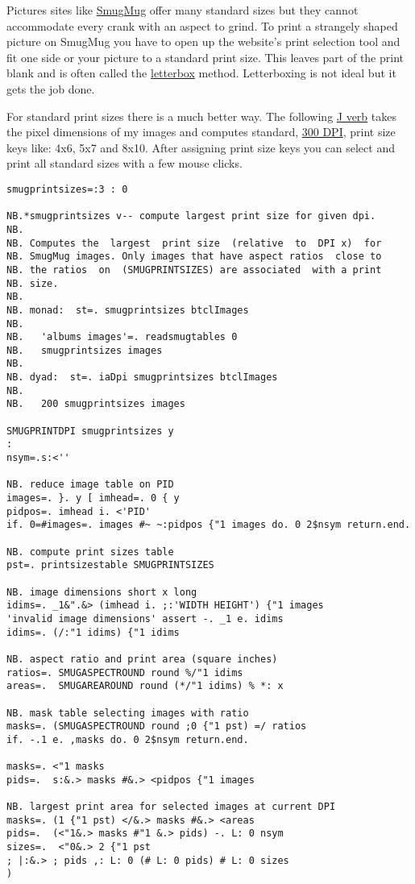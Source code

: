 Pictures sites like \href{http://www.smugmug.com/}{SmugMug} offer many
standard sizes but they cannot accommodate every crank with an aspect to
grind. To print a strangely shaped picture on SmugMug you have to open
up the website's print selection tool and fit one side or your picture
to a standard print size. This leaves part of the print blank and is
often called the
\href{http://en.wikipedia.org/wiki/Letterbox}{letterbox} method.
Letterboxing is not ideal but it gets the job done.

For standard print sizes there is a much better way. The following
\href{http://www.jsoftware.com/}{J verb} takes the pixel dimensions of
my images and computes standard,
\href{http://www.rideau-info.com/photos/mythdpi.html}{300 DPI}, print
size keys like: 4x6, 5x7 and 8x10. After assigning print size keys you
can select and print all standard sizes with a few mouse clicks.

\begin{tcolorbox}[breakable, size=fbox, boxrule=1pt, pad at break*=1mm,colback=cellbackground, colframe=cellborder]
\begin{lstlisting}[language=jdoc, frame=single,framerule=0pt,label=lst:scr442X0]
smugprintsizes=:3 : 0

NB.*smugprintsizes v-- compute largest print size for given dpi.
NB.
NB. Computes the  largest  print size  (relative  to  DPI x)  for
NB. SmugMug images. Only images that have aspect ratios  close to
NB. the ratios  on  (SMUGPRINTSIZES) are associated  with a print
NB. size.
NB.
NB. monad:  st=. smugprintsizes btclImages
NB.
NB.   'albums images'=. readsmugtables 0
NB.   smugprintsizes images
NB.
NB. dyad:  st=. iaDpi smugprintsizes btclImages
NB.
NB.   200 smugprintsizes images

SMUGPRINTDPI smugprintsizes y
:
nsym=.s:<''

NB. reduce image table on PID
images=. }. y [ imhead=. 0 { y
pidpos=. imhead i. <'PID'
if. 0=#images=. images #~ ~:pidpos {"1 images do. 0 2$nsym return.end.

NB. compute print sizes table
pst=. printsizestable SMUGPRINTSIZES

NB. image dimensions short x long
idims=. _1&".&> (imhead i. ;:'WIDTH HEIGHT') {"1 images
'invalid image dimensions' assert -. _1 e. idims
idims=. (/:"1 idims) {"1 idims

NB. aspect ratio and print area (square inches)
ratios=. SMUGASPECTROUND round %/"1 idims
areas=.  SMUGAREAROUND round (*/"1 idims) % *: x

NB. mask table selecting images with ratio
masks=. (SMUGASPECTROUND round ;0 {"1 pst) =/ ratios
if. -.1 e. ,masks do. 0 2$nsym return.end.

masks=. <"1 masks
pids=.  s:&.> masks #&.> <pidpos {"1 images

NB. largest print area for selected images at current DPI
masks=. (1 {"1 pst) </&.> masks #&.> <areas
pids=.  (<"1&.> masks #"1 &.> pids) -. L: 0 nsym
sizes=.  <"0&.> 2 {"1 pst
; |:&.> ; pids ,: L: 0 (# L: 0 pids) # L: 0 sizes
)
\end{lstlisting}
\end{tcolorbox}


%